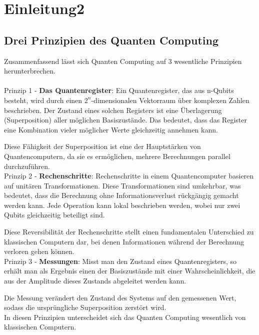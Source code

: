 \section{Einleitung2}
\label{sec:einleitung2}

\subsection{Drei Prinzipien des Quanten Computing}
\label{subsec:drei-prinzipien-des-quanten-computing}

Zusammenfassend lässt sich Quanten Computing auf 3 wesentliche Prinzipien herunterbrechen.\\\\
\textbullet Prinzip 1 - \textbf{Das Quantenregister}: Ein Quantenregister, das aus n-Qubits besteht, wird durch einen $2^n$-dimensionalen Vektorraum über komplexen Zahlen beschrieben.
Der Zustand eines solchen Registers ist eine Überlagerung (Superposition) aller möglichen Basiszustände.
Das bedeutet, dass das Register eine Kombination vieler möglicher Werte gleichzeitig annehmen kann.

Diese Fähigkeit der Superposition ist eine der Hauptstärken von Quantencomputern, da sie es ermöglichen, mehrere Berechnungen parallel durchzuführen.\\

\textbullet Prinzip 2 - \textbf{Rechenschritte}: Rechenschritte in einem Quantencomputer basieren auf unitären Transformationen.
Diese Transformationen sind umkehrbar, was bedeutet, dass die Berechnung ohne Informationsverlust rückgängig gemacht werden kann.
Jede Operation kann lokal beschrieben werden, wobei nur zwei Qubits gleichzeitig beteiligt sind.

Diese Reversibilität der Rechenschritte stellt einen fundamentalen Unterschied zu klassischen Computern dar, bei denen Informationen während der Berechnung verloren gehen können.\\

\textbullet Prinzip 3 - \textbf{Messungen}: Misst man den Zustand eines Quantenregisters, so erhält man als Ergebnis einen der Basiszustände mit einer Wahrscheinlichkeit, die aus der Amplitude dieses Zustands abgeleitet werden kann.

Die Messung verändert den Zustand des Systems auf den gemessenen Wert, sodass die ursprüngliche Superposition zerstört wird.\\

In diesen Prinzipien unterscheidet sich das Quanten Computing wesentlich von klassischen Computern.\\



